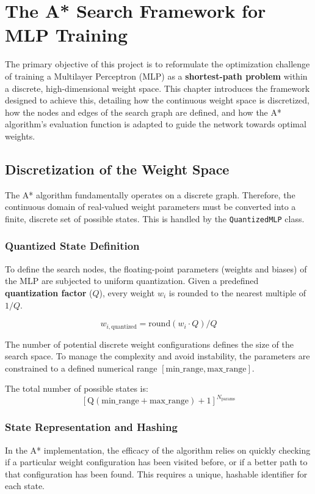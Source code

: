 \chapter{The A* Search Framework for MLP Training}
\label{chap:astar_framework}

The primary objective of this project is to reformulate the optimization challenge of training a Multilayer Perceptron (MLP) as a \textbf{shortest-path problem} within a discrete, high-dimensional weight space. This chapter introduces the framework designed to achieve this, detailing how the continuous weight space is discretized, how the nodes and edges of the search graph are defined, and how the A* algorithm's evaluation function is adapted to guide the network towards optimal weights.

\section{Discretization of the Weight Space}

The A* algorithm fundamentally operates on a discrete graph. Therefore, the continuous domain of real-valued weight parameters must be converted into a finite, discrete set of possible states. This is handled by the \texttt{QuantizedMLP} class.

\subsection{Quantized State Definition}
To define the search nodes, the floating-point parameters (weights and biases) of the MLP are subjected to uniform quantization. Given a predefined \textbf{quantization factor} ($Q$), every weight $w_i$ is rounded to the nearest multiple of $1/Q$.

$$w_{i, \text{quantized}} = \text{round}(w_i \cdot Q) / Q$$

The number of potential discrete weight configurations defines the size of the search space. To manage the complexity and avoid instability, the parameters are constrained to a defined numerical range $[\text{min\_range}, \text{max\_range}]$.

The total number of possible states is: 
$$[\text{Q} (\text{min\_range} + \text{max\_range}) + 1]^{N_{\text{params}}}$$

\subsection{State Representation and Hashing}
In the A* implementation, the efficacy of the algorithm relies on quickly checking if a particular weight configuration has been visited before, or if a better path to that configuration has been found. This requires a unique, hashable identifier for each state.


